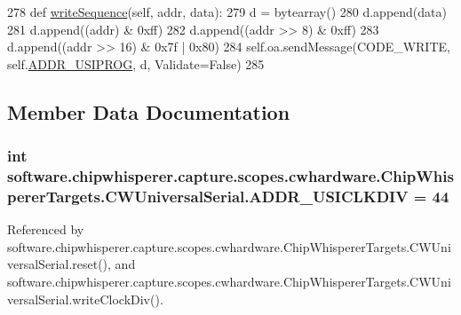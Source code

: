 \begin{DoxyCode}
278     \textcolor{keyword}{def }\hyperlink{classsoftware_1_1chipwhisperer_1_1capture_1_1scopes_1_1cwhardware_1_1ChipWhispererTargets_1_1CWUniversalSerial_ac1b2f72f9a937204a11b59cc742d9d32}{writeSequence}(self, addr, data):
279         d = bytearray()
280         d.append(data)
281         d.append((addr) & 0xff)
282         d.append((addr >> 8) & 0xff)
283         d.append((addr >> 16) & 0x7f | 0x80)
284         self.oa.sendMessage(CODE\_WRITE, self.\hyperlink{classsoftware_1_1chipwhisperer_1_1capture_1_1scopes_1_1cwhardware_1_1ChipWhispererTargets_1_1CWUniversalSerial_a6e7e62aca1622effbabe2d572589e6c2}{ADDR\_USIPROG}, d, Validate=\textcolor{keyword}{False})
285         
\end{DoxyCode}


\subsection{Member Data Documentation}
\hypertarget{classsoftware_1_1chipwhisperer_1_1capture_1_1scopes_1_1cwhardware_1_1ChipWhispererTargets_1_1CWUniversalSerial_abcfde3f48091968528c889cceff0b7a4}{}
\subsubsection[{A\+D\+D\+R\+\_\+\+U\+S\+I\+C\+L\+K\+D\+I\+V}]{\setlength{\rightskip}{0pt plus 5cm}int software.\+chipwhisperer.\+capture.\+scopes.\+cwhardware.\+Chip\+Whisperer\+Targets.\+C\+W\+Universal\+Serial.\+A\+D\+D\+R\+\_\+\+U\+S\+I\+C\+L\+K\+D\+I\+V = 44\hspace{0.3cm}{\ttfamily [static]}}\label{classsoftware_1_1chipwhisperer_1_1capture_1_1scopes_1_1cwhardware_1_1ChipWhispererTargets_1_1CWUniversalSerial_abcfde3f48091968528c889cceff0b7a4}


Referenced by software.\+chipwhisperer.\+capture.\+scopes.\+cwhardware.\+Chip\+Whisperer\+Targets.\+C\+W\+Universal\+Serial.\+reset(), and software.\+chipwhisperer.\+capture.\+scopes.\+cwhardware.\+Chip\+Whisperer\+Targets.\+C\+W\+Universal\+Serial.\+write\+Clock\+Div().

